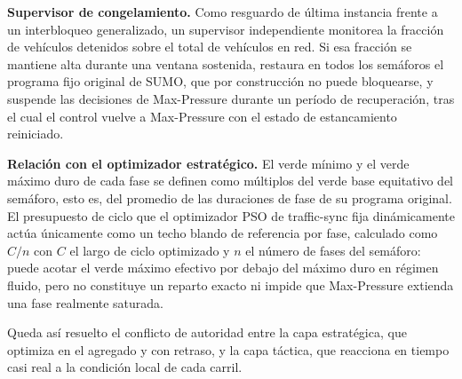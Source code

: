\textbf{Supervisor de congelamiento.} Como resguardo de última instancia frente a un interbloqueo generalizado, un supervisor independiente monitorea la fracción de vehículos detenidos sobre el total de vehículos en red. Si esa fracción se mantiene alta durante una ventana sostenida, restaura en todos los semáforos el programa fijo original de SUMO, que por construcción no puede bloquearse, y suspende las decisiones de Max-Pressure durante un período de recuperación, tras el cual el control vuelve a Max-Pressure con el estado de estancamiento reiniciado.

\textbf{Relación con el optimizador estratégico.} El verde mínimo y el verde máximo duro de cada fase se definen como múltiplos del verde base equitativo del semáforo, esto es, del promedio de las duraciones de fase de su programa original. El presupuesto de ciclo que el optimizador PSO de traffic-sync fija dinámicamente actúa únicamente como un techo blando de referencia por fase, calculado como $C/n$ con $C$ el largo de ciclo optimizado y $n$ el número de fases del semáforo: puede acotar el verde máximo efectivo por debajo del máximo duro en régimen fluido, pero no constituye un reparto exacto ni impide que Max-Pressure extienda una fase realmente saturada.

Queda así resuelto el conflicto de autoridad entre la capa estratégica, que optimiza en el agregado y con retraso, y la capa táctica, que reacciona en tiempo casi real a la condición local de cada carril.

